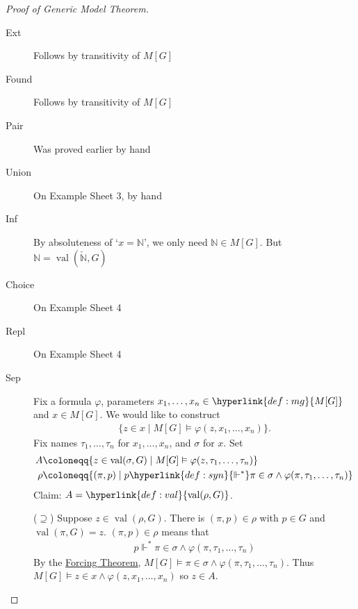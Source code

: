 \documentclass{article}
\newcommand{\1}{\mathbbm{1}}
\DeclareMathOperator{\val}{val}
\let\models\vDash
\let\forces\Vdash
\begin{document}
\begin{proof}[Proof of Generic Model Theorem]\leavevmode
  \begin{description}
    \item[\textsf{Ext}] Follows by transitivity of $M[G]$
    \item[\textsf{Found}] Follows by transitivity of $M[G]$
    \item[\textsf{Pair}] Was proved earlier by hand
    \item[\textsf{Union}] On Example Sheet 3, by hand
    \item[\textsf{Inf}] By absoluteness of `$x = \mathbb{N}$', we only need $\mathbb{N} \in M[G]$.
      But $\mathbb{N} = \val(\check{\mathbb{N}},G)$
    \item[\textsf{Choice}] On Example Sheet 4
    \item[\textsf{Repl}] On Example Sheet 4
    \item[\textsf{Sep}] Fix a formula $\varphi$, parameters $x_1, \dotsc, x_n \in \hyperlink{def:mg}{M[G]}$ and $x \in M[G]$. We would like to construct
      \begin{align*}
        \{z \in x \mid M[G] \models \varphi(z, x_1, \dotsc, x_n)\}.
      \end{align*}
      Fix names $\tau_1, \dotsc, \tau_n$ for $x_1, \dotsc, x_n$, and $\sigma$ for $x$.
      Set
      \begin{align*}
        A &\coloneqq \{z \in \val(\sigma,G) \mid M[G] \models \varphi(z, \tau_1, \dotsc, \tau_n)\} \\
        \rho &\coloneqq \{(\pi,p) \mid p \hyperlink{def:syn}{\forces^*} \pi \in \sigma \land \varphi(\pi, \tau_1, \dotsc, \tau_n)\}
      \end{align*}
      Claim: $A = \hyperlink{def:val}{\val(\rho,G)}$.

      ($\supseteq$) Suppose $z \in \val(\rho,G)$. There is $(\pi,p) \in \rho$ with $p \in G$ and $\val(\pi,G) = z$.
      $(\pi,p) \in \rho$ means that
      \begin{align*}
        p \forces^* \pi \in \sigma \land \varphi(\pi, \tau_1, \dotsc, \tau_n)
      \end{align*}
      By the \hyperlink{thm:forcing}{Forcing Theorem}, $M[G] \models \pi \in \sigma \land \varphi(\pi, \tau_1, \dotsc, \tau_n)$.
      Thus $M[G] \models z \in x \land \varphi(z, x_1, \dotsc, x_n)$
      so $z \in A$.


\end{description}
\end{proof}
\end{document}
